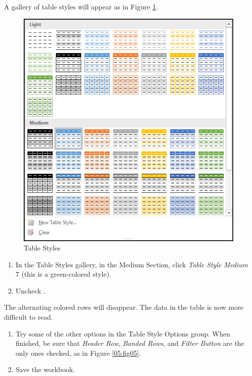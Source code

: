 A gallery of table styles will appear as in Figure \ref{05:fig04}.

\begin{figure}[H]
	\centering
	\includegraphics[width=\maxwidth{.75\linewidth}]{gfx/ch05_fig04}
	\caption{Table Styles}
	\label{05:fig04}
\end{figure}

\begin{enumerate}[resume]
	\item In the Table Styles gallery, in the Medium Section, click \textit{Table Style Medium} $ 7 $ (this is a green-colored style).
	\item Uncheck .
\end{enumerate}

The alternating colored rows will disappear. The data in the table is now more difficult to read.

\begin{enumerate}[resume]
	\item Try some of the other options in the Table Style Options group. When finished, be sure that \textit{Header Row}, \textit{Banded Rows}, and \textit{Filter Button} are the only ones checked, as in Figure \ref{05:fig05}.
	\item Save the  workbook.
\end{enumerate}


